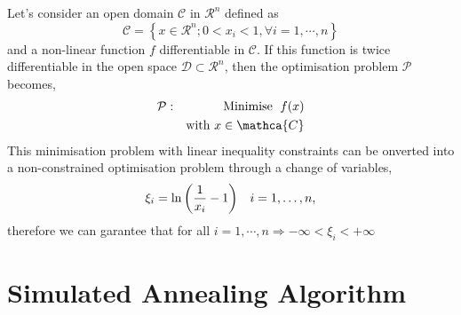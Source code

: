     Let's consider an open domain $\mathcal{C}$ in $\mathcal{R}^{n}$ defined as
\begin{displaymath}
    \mathcal{C} = \left\{x\in\mathcal{R}^{n}; 0<x_{i} <1, \forall i=1,\cdots,n\right\}
\end{displaymath}
and a non-linear function $f$ differentiable in $\mathcal{C}$. If this function is twice differentiable in the open space $\mathcal{D}\subset\mathcal{R}^{n}$, then the optimisation problem $\mathcal{P}$ becomes,
\begin{eqnarray}
   \mathcal{P}:&& \text{Minimise }\; f(x)      \nonumber \\
               && \text{with } x\in\mathca{C}  \nonumber
\end{eqnarray}
This minimisation problem with linear inequality constraints can be onverted into a non-constrained optimisation problem through a change of variables,
\begin{displaymath}
    \xi_{i} = \ln\left(\displaystyle\frac{1}{x_{i}}-1\right)\;\;\; i=1,\dots,n,
\end{displaymath}
therefore we can garantee that for all $i=1,\cdots,n \Rightarrow -\infty < \xi_{i} < +\infty$


\clearpage
\section{Simulated Annealing Algorithm}\label{Chapter:GlobalOpt:Section:SimulatedAnnealing}

